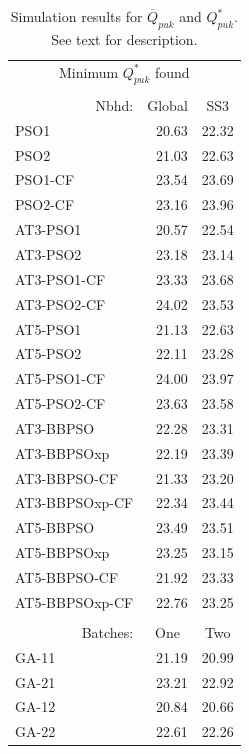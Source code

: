\documentclass[cmbright]{staauth}
\begin{document}
\begin{table}[ht]
\begin{tabular}{l|r|r}
\multicolumn{3}{c}{Minimum $Q^*_{puk}$ found}\\
\multicolumn{3}{c}{}\\
\multicolumn{1}{r}{Nbhd:} & \multicolumn{1}{c}{Global} & \multicolumn{1}{c}{SS3} \\
  \hline
PSO1 & 20.63 & 22.32 \\
  PSO2 & 21.03 & 22.63 \\
  PSO1-CF & 23.54 & 23.69 \\
  PSO2-CF & 23.16 & 23.96 \\
   \hline
AT3-PSO1 & 20.57 & 22.54 \\
  AT3-PSO2 & 23.18 & 23.14 \\
  AT3-PSO1-CF & 23.33 & 23.68 \\
  AT3-PSO2-CF & 24.02 & 23.53 \\
   \hline
AT5-PSO1 & 21.13 & 22.63 \\
  AT5-PSO2 & 22.11 & 23.28 \\
  AT5-PSO1-CF & 24.00 & 23.97 \\
  AT5-PSO2-CF & 23.63 & 23.58 \\
   \hline
AT3-BBPSO & 22.28 & 23.31 \\
  AT3-BBPSOxp & 22.19 & 23.39 \\
  AT3-BBPSO-CF & 21.33 & 23.20 \\
  AT3-BBPSOxp-CF & 22.34 & 23.44 \\
   \hline
AT5-BBPSO & 23.49 & 23.51 \\
  AT5-BBPSOxp & 23.25 & 23.15 \\
  AT5-BBPSO-CF & 21.92 & 23.33 \\
  AT5-BBPSOxp-CF & 22.76 & 23.25 \\
   \hline
\multicolumn{3}{c}{}\\
\multicolumn{1}{r}{Batches:} & \multicolumn{1}{c}{One} & \multicolumn{1}{c}{Two} \\\hline
GA-11 & 21.19 & 20.99 \\
  GA-21 & 23.21 & 22.92 \\
  GA-12 & 20.84 & 20.66 \\
  GA-22 & 22.61 & 22.26 \\
\hline
  \end{tabular}
\endgroup
\caption{Simulation results for $\overline{Q}_{puk}$ and $Q^*_{puk}$. See text for description.}
\label{tab:psokriging}
\end{table}
\end{document}
